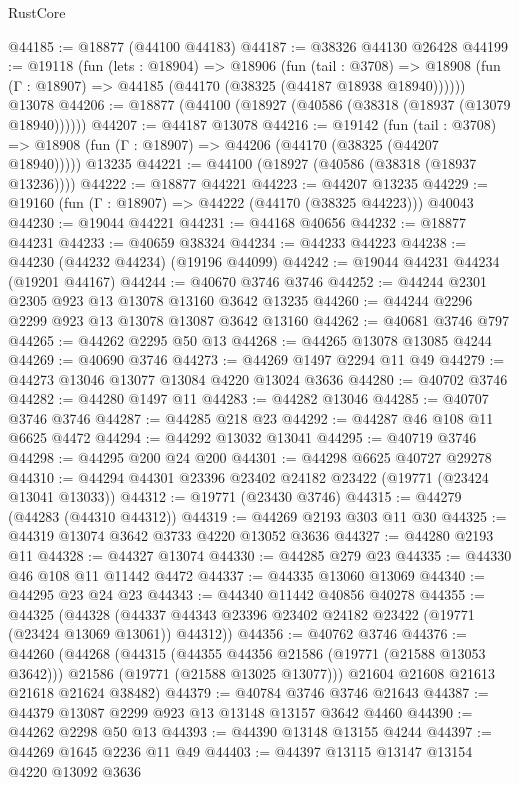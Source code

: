 \begin{lexlean}{RustCore}
\begin{coremodule}
@44185 := @18877 (@44100 @44183)
@44187 := @38326 @44130 @26428
@44199 := @19118
    (fun (lets : @18904) =>
    @18906
      (fun (tail : @3708) =>
      @18908 (fun (Γ : @18907) => @44185 (@44170 (@38325 (@44187 @18938 @18940))))))
    @13078
@44206 := @18877 (@44100 (@18927 (@40586 (@38318 (@18937 (@13079 @18940))))))
@44207 := @44187 @13078
@44216 := @19142
    (fun (tail : @3708) => @18908 (fun (Γ : @18907) => @44206 (@44170 (@38325 (@44207 @18940)))))
    @13235
@44221 := @44100 (@18927 (@40586 (@38318 (@18937 @13236))))
@44222 := @18877 @44221
@44223 := @44207 @13235
@44229 := @19160 (fun (Γ : @18907) => @44222 (@44170 (@38325 @44223))) @40043
@44230 := @19044 @44221
@44231 := @44168 @40656
@44232 := @18877 @44231
@44233 := @40659 @38324
@44234 := @44233 @44223
@44238 := @44230 (@44232 @44234) (@19196 @44099)
@44242 := @19044 @44231 @44234 (@19201 @44167)
@44244 := @40670 @3746 @3746
@44252 := @44244 @2301 @2305 @923 @13 @13078 @13160 @3642 @13235
@44260 := @44244 @2296 @2299 @923 @13 @13078 @13087 @3642 @13160
@44262 := @40681 @3746 @797
@44265 := @44262 @2295 @50 @13
@44268 := @44265 @13078 @13085 @4244
@44269 := @40690 @3746
@44273 := @44269 @1497 @2294 @11 @49
@44279 := @44273 @13046 @13077 @13084 @4220 @13024 @3636
@44280 := @40702 @3746
@44282 := @44280 @1497 @11
@44283 := @44282 @13046
@44285 := @40707 @3746 @3746
@44287 := @44285 @218 @23
@44292 := @44287 @46 @108 @11 @6625 @4472
@44294 := @44292 @13032 @13041
@44295 := @40719 @3746
@44298 := @44295 @200 @24 @200
@44301 := @44298 @6625 @40727 @29278
@44310 := @44294 @44301 @23396 @23402 @24182 @23422 (@19771 (@23424 @13041 @13033))
@44312 := @19771 (@23430 @3746)
@44315 := @44279 (@44283 (@44310 @44312))
@44319 := @44269 @2193 @303 @11 @30
@44325 := @44319 @13074 @3642 @3733 @4220 @13052 @3636
@44327 := @44280 @2193 @11
@44328 := @44327 @13074
@44330 := @44285 @279 @23
@44335 := @44330 @46 @108 @11 @11442 @4472
@44337 := @44335 @13060 @13069
@44340 := @44295 @23 @24 @23
@44343 := @44340 @11442 @40856 @40278
@44355 := @44325
    (@44328 (@44337 @44343 @23396 @23402 @24182 @23422 (@19771 (@23424 @13069 @13061)) @44312))
@44356 := @40762 @3746
@44376 := @44260
    (@44268
      (@44315
        (@44355 @44356 @21586 (@19771 (@21588 @13053 @3642)))
        @21586
        (@19771 (@21588 @13025 @13077)))
      @21604
      @21608
      @21613
      @21618
      @21624
      @38482)
@44379 := @40784 @3746 @3746 @21643
@44387 := @44379 @13087 @2299 @923 @13 @13148 @13157 @3642 @4460
@44390 := @44262 @2298 @50 @13
@44393 := @44390 @13148 @13155 @4244
@44397 := @44269 @1645 @2236 @11 @49
@44403 := @44397 @13115 @13147 @13154 @4220 @13092 @3636

\end{coremodule}
\end{lexlean}
